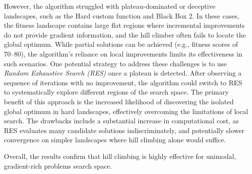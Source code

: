 \documentclass[11pt]{article}
\begin{document}
However, the algorithm struggled with plateau-dominated or deceptive landscapes, such as the Hard custom function and Black Box 2. In these cases, the fitness landscape contains large flat regions where incremental improvements do not provide gradient information, and the hill climber often fails to locate the global optimum. While partial solutions can be achieved (e.g., fitness scores of 70--80), the algorithm’s reliance on local improvements limits its effectiveness in such scenarios.  
One potential strategy to address these challenges is to use \textit{Random Exhaustive Search (RES)} once a plateau is detected. After observing a sequence of iterations with no improvement, the algorithm could switch to RES to systematically explore different regions of the search space. The primary benefit of this approach is the increased likelihood of discovering the isolated global optimum in hard landscapes, effectively overcoming the limitations of local search. The drawbacks include a substantial increase in computational cost, as RES evaluates many candidate solutions indiscriminately, and potentially slower convergence on simpler landscapes where hill climbing alone would suffice.  

Overall, the results confirm that hill climbing is highly effective for unimodal, gradient-rich problems search space.
\end{document}
